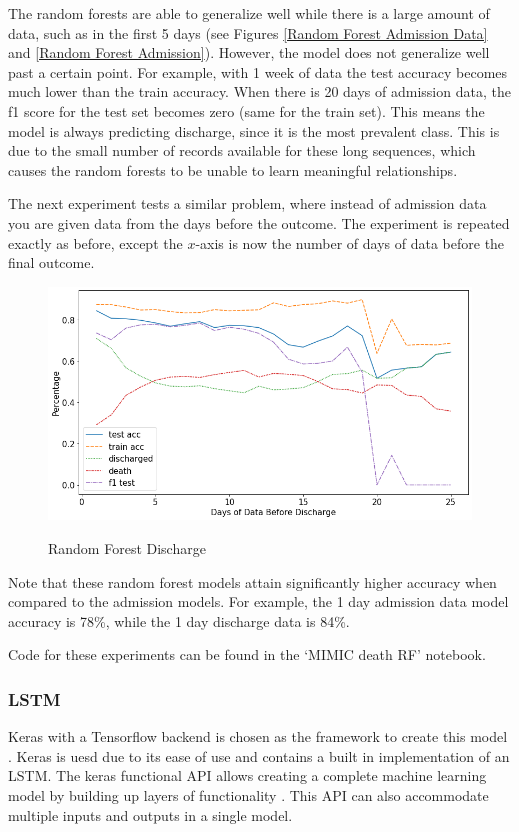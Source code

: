 \documentclass[12pt]{article}
\begin{document}
The random forests are able to generalize well while there is a large amount of data, such as in the first 5 days (see Figures \ref{Random Forest Admission Data} and \ref{Random Forest Admission}). However, the model does not generalize well past a certain point. For example, with 1 week of data the test accuracy becomes much lower than the train accuracy. When there is 20 days of admission data, the f1 score for the test set becomes zero (same for the train set). This means the model is always predicting discharge, since it is the most prevalent class. This is due to the small number of records available for these long sequences, which causes the random forests to be unable to learn meaningful relationships.

The next experiment tests a similar problem, where instead of admission data you are given data from the days before the outcome. The experiment is repeated exactly as before, except the $x$-axis is now the number of days of data before the final outcome.

\begin{figure}[H]
\centering\caption{Random Forest Discharge}
\includegraphics[scale=0.45]{Random Forest Discharge.png}
\label{Random Forest Discharge}
\end{figure}
Note that these random forest models attain significantly higher accuracy when compared to the admission models. For example, the 1 day admission data model accuracy is 78\%, while the 1 day discharge data is 84\%.


Code for these experiments can be found in the `MIMIC death RF' notebook. 

\subsubsection{LSTM}
\label{LSTM}
Keras with a Tensorflow backend is chosen as the framework to create this model \cite{keras}. Keras is uesd due to its ease of use and contains a built in implementation of an LSTM. The keras functional API allows creating a complete machine learning model by building up layers of functionality \cite{keras}. This API can also accommodate multiple inputs and outputs in a single model. 
\end{document}
